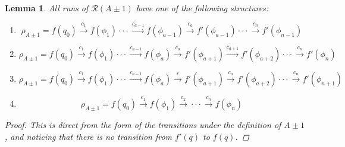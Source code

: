 \documentclass{article}
\newcommand{\trans}[1]{\overset{#1}{\longrightarrow}}
\newtheorem{lemma}{Lemma}
\begin{document}
\begin{lemma}\label{LemmaTypesOfRuns}
    All runs of $\mathcal{R}(A\pm 1)$ have one of the following structures:
    \begin{enumerate}
        \item \begin{equation*}
            \rho_{A\pm 1} = f(q_0) \trans{c_1}
            f(\phi_1) \cdot\cdot\cdot
            \trans{c_{a-1}} f(\phi_{a-1})
            \trans{c_{a}} f'(\phi_{a-1})  \cdot
            \cdot \cdot \trans{c_n} f'(\phi_{n-1})
              \end{equation*}
        \item \begin{equation*}
            \rho_{A\pm 1} = f(q_0) \trans{c_1}
            f(\phi_1) \cdot\cdot\cdot\trans{c_{a-1}}
            f(\phi_a) \trans{c_{a}} f'(\phi_{a+1})
            \trans{c_{a+1}} f'(\phi_{a + 2})  \cdot
            \cdot \cdot \trans{c_n} f'(\phi_n)
              \end{equation*}
        \item \begin{equation*}
            \rho_{A\pm 1} = f(q_0) \trans{c_1}
            f(\phi_1) \cdot\cdot\cdot\trans{c_{a-1}}
            f(\phi_a) \trans{\epsilon} {f'(\phi_{a + 1})} \trans{c_{a}} f'(\phi_{a+2})
              \cdot
            \cdot \cdot \trans{c_n} f'(\phi_{n + 1})
              \end{equation*}
        \item \begin{equation*}
                \rho_{A\pm1} = f(q_0) \trans{c_1} f(\phi_1)
                \trans{c_2} \cdot\cdot\cdot
                \trans{c_n}f(\phi_n)
              \end{equation*}
    \end{enumerate}
    \begin{proof}

    This is direct from the form of the transitions under the definition of $A \pm 1$, and noticing that there is no transition from $f'(q)$ to $f(q)$.
    \end{proof}
\end{lemma}
\end{document}
